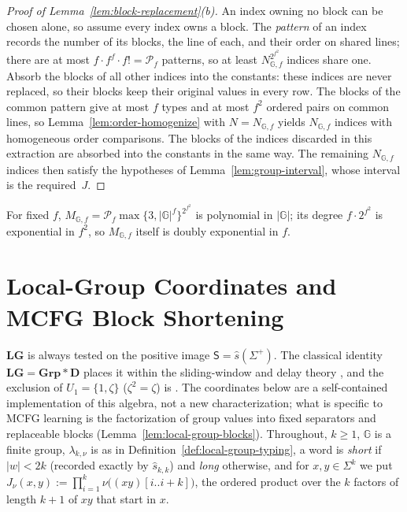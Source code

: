 \documentclass[11pt]{article}
\numberwithin{equation}{section}
\theoremstyle{plain}
\theoremstyle{definition}
\theoremstyle{remark}
\begin{document}
\begin{proof}[Proof of Lemma~\ref{lem:block-replacement}\textup{(b)}]
An index owning no block can be chosen alone, so assume every index owns a block.
The \emph{pattern} of an index records the number of its blocks, the line of each,
and their order on shared lines; there are at most $f\cdot f^f\cdot f!=\mathcal P_f$
patterns, so at least $N_{{\mathbb G},f}^{2^{f^2}}$ indices share one.  Absorb the blocks of
all other indices into the constants: these indices are never replaced, so their
blocks keep their original values in every row.  The blocks of the common pattern
give at most $f$ types and at most $f^2$ ordered pairs on common lines, so
Lemma~\ref{lem:order-homogenize} with $N=N_{{\mathbb G},f}$ yields $N_{{\mathbb G},f}$
indices with homogeneous order comparisons.  The blocks of the indices discarded
in this extraction are absorbed into the constants in the same way.  The remaining
$N_{{\mathbb G},f}$ indices then satisfy the hypotheses of
Lemma~\ref{lem:group-interval}, whose interval is the required~$J$.
\end{proof}

For fixed $f$, $M_{{\mathbb G},f}=\mathcal P_f\max\{3,|{\mathbb G}|^f\}^{2^{f^2}}$ is polynomial in $|{\mathbb G}|$; its
degree $f\cdot2^{f^2}$ is exponential in $f^2$, so $M_{{\mathbb G},f}$ itself is doubly
exponential in $f$.

\section{Local-Group Coordinates and MCFG Block Shortening}
\label{app:local-group}

$\mathbf{LG}$ is always tested on the positive image $\mathsf S=\widehat s(\Sigma^+)$.  The
classical identity $\mathbf{LG}=\mathbf{Grp}*\mathbf D$ places it within the
sliding-window and delay theory \cite{Straubing1985,Tilson1987}, and the exclusion of
$U_1=\{1,\zeta\}$ ($\zeta^2=\zeta$) is \cite[Proposition~2.3]{AlmeidaEtAl2009}.
The coordinates below are a self-contained implementation of this algebra, not a
new characterization; what is specific to MCFG learning is the factorization of group
values into fixed separators and replaceable blocks
(Lemma~\ref{lem:local-group-blocks}).  Throughout, $k\ge1$, ${\mathbb G}$ is a finite group,
$\lambda_{k,\nu}$ is as in Definition~\ref{def:local-group-typing}, a word is
\emph{short} if $|w|<2k$ (recorded exactly by $\widehat s_{k,k}$) and \emph{long}
otherwise, and for $x,y\in\Sigma^k$ we put
$J_\nu(x,y):=\prod_{i=1}^{k}\nu\bigl((xy)[i..i+k]\bigr)$, the ordered product over
the $k$ factors of length $k+1$ of $xy$ that start in $x$.
\end{document}
